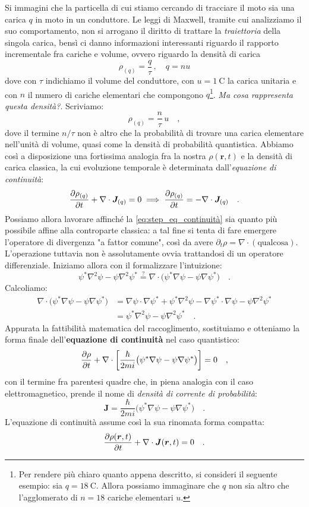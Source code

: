 Si immagini che la particella di cui stiamo cercando di tracciare il moto sia una carica $q$ in moto in un conduttore. Le leggi di Maxwell, tramite cui analizziamo il suo comportamento, non si arrogano il diritto di trattare la \emph{traiettoria} della singola carica, bensì ci danno informazioni interessanti riguardo il rapporto incrementale fra cariche e volume, ovvero riguardo la densità di carica 
\[
\rho_{(q)} = \frac{q}{\tau} \,, \quad q = nu
\]
dove con $\tau$ indichiamo il volume del conduttore, con $u = \SI{1}{\coulomb}$ la carica unitaria e con $n$ il numero di cariche elementari che compongono $q$\footnote{Per rendere più chiaro quanto appena descritto, si consideri il seguente esempio: sia $q = \SI{18}{\coulomb}$. Allora possiamo immaginare che $q$ non sia altro che l'agglomerato di $n = 18$ cariche elementari $u$.}. \guillemetleft\emph{Ma cosa rappresenta questa densità?}\guillemetright. Scriviamo:
\[
    \rho_{(q)} = \frac{n}{\tau} \, u\quad,
\] 
dove il termine $n/\tau$ non è altro che la probabilità di trovare una carica elementare nell'unità di volume, quasi come la densità di probabilità quantistica. Abbiamo così a disposizione una fortissima analogia fra la nostra $\rho(\bm{r},t)$ e la densità di carica classica, la cui evoluzione temporale è determinata dall'\emph{equazione di continuità}:
\[
    \pdv{\rho_{(q)}}{t} + \nabla \cdot \bm{J}_{(q)} = 0 \implies \pdv{\rho_{(q)}}{t} = -\nabla \cdot \bm{J}_{(q)} \quad.
\] 
Possiamo allora lavorare affinché la \eqref{eq:step_eq_continuità} sia quanto più possibile affine alla controparte classica: a tal fine si tenta di fare emergere l'operatore di divergenza "a fattor comune", così da avere $\partial_t \rho = \nabla \cdot (\text{qualcosa})$. L'operazione tuttavia non è assolutamente ovvia trattandosi di un operatore differenziale. Iniziamo allora con il formalizzare l'intuizione:
\[
    \psi^*\nabla^2\psi - \psi\nabla^2\psi^* \overset{?}{=} \nabla \cdot \big( \psi^*\nabla\psi - \psi\nabla\psi^* \big) \quad.
\]
Calcoliamo:
\[
\begin{aligned}
    \nabla \cdot \big( \psi^*\nabla\psi - \psi\nabla\psi^* \big) &= \nabla\psi\cdot\nabla\psi^* + \psi^*\nabla^2\psi - \nabla\psi^* \cdotp\nabla\psi - \psi\nabla^2\psi^* \\ &= \psi^*\nabla^2\psi - \psi\nabla^2\psi^* \quad.
\end{aligned}
\]
Appurata la fattibilità matematica del raccoglimento, sostituiamo e otteniamo la forma finale dell'\textbf{equazione di continuità} nel caso quantistico:
\[
    \pdv{\rho}{t} + \nabla \cdot \left[\frac{\hbar}{2mi}\big( \psi^*\nabla\psi - \psi\nabla\psi^* \big) \right] = 0 \quad,
\]
con il termine fra parentesi quadre che, in piena analogia con il caso elettromagnetico, prende il nome di \textit{densità di corrente di probabilità}:
\[
    \bm{J} = \frac{\hbar}{2mi}\big( \psi^*\nabla\psi - \psi\nabla\psi^* \big) \quad.
\]
L'equazione di continuità assume così la sua rinomata forma compatta:
\[
    \pdv{\rho(\bm{r}, t)}{t} + \nabla \cdot \bm{J}(\bm{r},t) = 0 \quad.
\]

